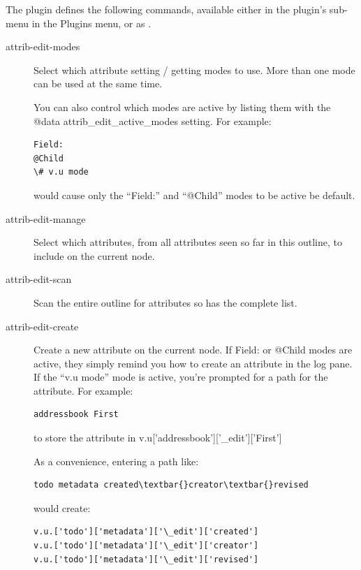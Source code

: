 \documentclass[a4paper,10pt,english]{sphinxmanual}
\begin{document}
The plugin defines the following commands, available either in the
plugin's sub-menu in the Plugins menu, or as .
\begin{description}
\item[{attrib-edit-modes}] \leavevmode
Select which attribute setting / getting modes to use.  More than one mode
can be used at the same time.

You can also control which modes are active by listing them
with the @data attrib\_edit\_active\_modes setting.  For example:

\begin{Verbatim}[commandchars=\\\{\}]
Field:
@Child
\# v.u mode
\end{Verbatim}

would cause only the ``Field:'' and ``@Child'' modes to be active be default.

\item[{attrib-edit-manage}] \leavevmode
Select which attributes, from all attributes seen so
far in this outline, to include on the current node.

\item[{attrib-edit-scan}] \leavevmode
Scan the entire outline for attributes so 
has the complete list.

\item[{attrib-edit-create}] \leavevmode
Create a new attribute on the current node.  If Field: or @Child modes
are active, they simply remind you how to create an attribute in the log pane.
If the ``v.u mode'' mode is active, you're prompted for a path for the attribute.
For example:

\begin{Verbatim}[commandchars=\\\{\}]
addressbook First
\end{Verbatim}

to store the attribute in v.u{[}'addressbook'{]}{[}'\_edit'{]}{[}'First'{]}

As a convenience, entering a path like:

\begin{Verbatim}[commandchars=\\\{\}]
todo metadata created\textbar{}creator\textbar{}revised
\end{Verbatim}

would create:

\begin{Verbatim}[commandchars=\\\{\}]
v.u.['todo']['metadata']['\_edit']['created']
v.u.['todo']['metadata']['\_edit']['creator']
v.u.['todo']['metadata']['\_edit']['revised']
\end{Verbatim}

\end{description}
\end{document}
